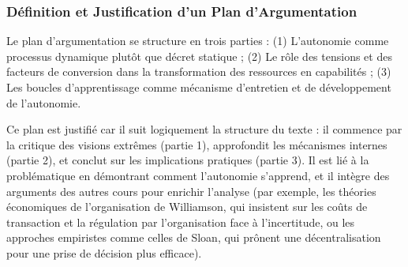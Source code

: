 \documentclass{rapportECL}
\begin{document}
\subsubsection{Définition et Justification d’un Plan d’Argumentation}
Le plan d’argumentation se structure en trois parties : (1) L’autonomie comme processus dynamique plutôt que décret statique ; (2) Le rôle des tensions et des facteurs de conversion dans la transformation des ressources en capabilités ; (3) Les boucles d’apprentissage comme mécanisme d’entretien et de développement de l’autonomie.

Ce plan est justifié car il suit logiquement la structure du texte : il commence par la critique des visions extrêmes (partie 1), approfondit les mécanismes internes (partie 2), et conclut sur les implications pratiques (partie 3). Il est lié à la problématique en démontrant comment l’autonomie s’apprend, et il intègre des arguments des autres cours pour enrichir l’analyse (par exemple, les théories économiques de l’organisation de Williamson, qui insistent sur les coûts de transaction et la régulation par l’organisation face à l’incertitude, ou les approches empiristes comme celles de Sloan, qui prônent une décentralisation pour une prise de décision plus efficace).
\end{document}
